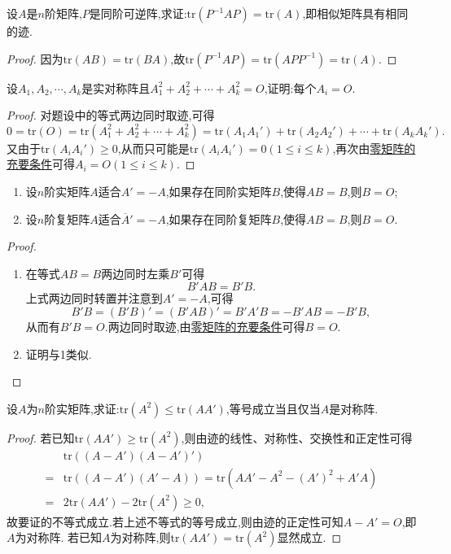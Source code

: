 \documentclass[lang=cn,newtx,10pt,scheme=chinese]{elegantbook}
\begin{document}
\begin{example}
设\(A\)是\(n\)阶矩阵,\(P\)是同阶可逆阵,求证:\(\mathrm{tr}(P^{-1}AP)=\mathrm{tr}(A)\),即相似矩阵具有相同的迹.
\end{example}
\begin{proof}
因为\(\mathrm{tr}(AB)=\mathrm{tr}(BA)\),故\(\mathrm{tr}(P^{-1}AP)=\mathrm{tr}(APP^{-1})=\mathrm{tr}(A)\).
\end{proof}

\begin{example}
设\(A_1,A_2,\cdots,A_k\)是实对称阵且\(A_1^2 + A_2^2+\cdots+A_k^2 = O\),证明:每个\(A_i = O\).
\end{example}
\begin{proof}
对题设中的等式两边同时取迹,可得
\[
0=\mathrm{tr}(O)=\mathrm{tr}(A_1^2 + A_2^2+\cdots+A_k^2)=\mathrm{tr}(A_1A_1')+\mathrm{tr}(A_2A_2')+\cdots+\mathrm{tr}(A_kA_k').
\]
又由于\(\mathrm{tr}(A_iA_i')\geq0\),从而只可能是\(\mathrm{tr}(A_iA_i') = 0(1\leq i\leq k)\),再次由\hyperref[proposition:零矩阵的充要条件]{零矩阵的充要条件}可得\(A_i = O(1\leq i\leq k)\).
\end{proof}

\begin{proposition}\label{proposition:反称/反酉矩阵为零矩阵的充要条件}
\begin{enumerate}
\item 设\(n\)阶实矩阵\(A\)适合\(A'=-A\),如果存在同阶实矩阵\(B\),使得\(AB = B\),则\(B = O\);
\item 设\(n\)阶复矩阵\(A\)适合\(\overline{A}'=-A\),如果存在同阶复矩阵\(B\),使得\(AB = B\),则\(B = O\).
\end{enumerate}
\end{proposition}
\begin{proof}
\begin{enumerate}
\item 在等式\(AB = B\)两边同时左乘\(B'\)可得
\[
B'AB = B'B.
\]
上式两边同时转置并注意到\(A'=-A\),可得
\[
B'B=(B'B)'=(B'AB)'=B'A'B=-B'AB=-B'B,
\]
从而有\(B'B = O\).两边同时取迹,由\hyperref[proposition:零矩阵的充要条件]{零矩阵的充要条件}可得\(B = O\).
\item 证明与1类似.
\end{enumerate}
\end{proof}

\begin{proposition}\label{proposition:矩阵迹的不等式}
设\(A\)为\(n\)阶实矩阵,求证:\(\mathrm{tr}(A^2)\leq\mathrm{tr}(AA')\),等号成立当且仅当\(A\)是对称阵.
\end{proposition}
\begin{proof}
若已知$\mathrm{tr}(AA') \geq \mathrm{tr}(A^2)$,则由迹的线性、对称性、交换性和正定性可得
\begin{align*}
&\mathrm{tr}((A - A')(A - A')')\\
=&\mathrm{tr}((A - A')(A' - A))=\mathrm{tr}(AA' - A^2 - (A')^2 + A'A)\\
=&2\mathrm{tr}(AA') - 2\mathrm{tr}(A^2)\geq0,
\end{align*}
故要证的不等式成立.若上述不等式的等号成立,则由迹的正定性可知\(A - A' = O\),即\(A\)为对称阵.
若已知$A$为对称阵,则$\mathrm{tr}(AA') = \mathrm{tr}(A^2)$显然成立.
\end{proof}
\end{document}
